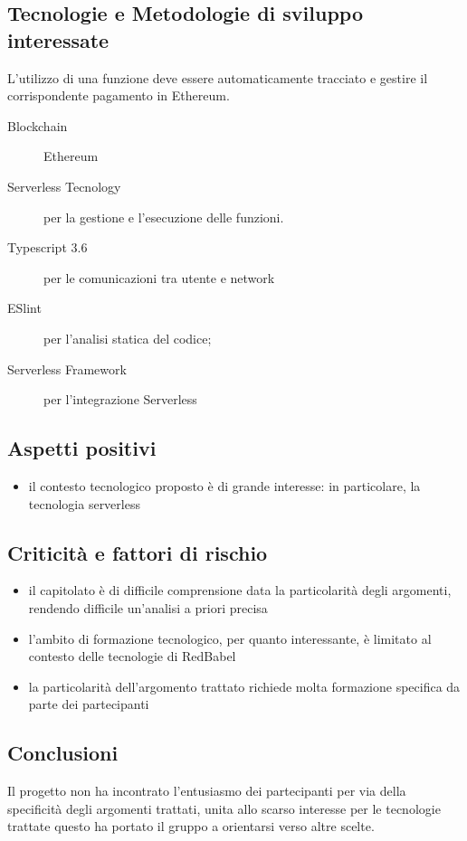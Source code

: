 \documentclass[../studio-di-fattibilita.tex]{subfiles}
\begin{document}
	\subsection{Tecnologie e Metodologie di sviluppo interessate}
	\label{subsec:tecnologie_interessate}
    L'utilizzo di una funzione deve essere automaticamente tracciato e gestire il corrispondente pagamento in Ethereum.	
	\begin{description}
		\item[Blockchain] Ethereum
		\item[Serverless Tecnology] per la gestione e l'esecuzione delle funzioni.
		\item[Typescript 3.6] per le comunicazioni tra utente e network
		\item[ESlint] per l'analisi statica del codice;
		\item[Serverless Framework] per l'integrazione Serverless
	\end{description}
	\subsection{Aspetti positivi}
	\label{subsec:aspetti_positivi}
	\begin{itemize}
		\item il contesto tecnologico proposto è di grande interesse: in particolare, la tecnologia serverless
	\end{itemize}
	\subsection{Criticità e fattori di rischio}
	\label{subsec:criticità_e_fattori_di_rischio}
	\begin{itemize}
		\item il capitolato è di difficile comprensione data la particolarità degli argomenti, rendendo difficile un'analisi a priori precisa 
		\item l'ambito di formazione tecnologico, per quanto interessante, è limitato al contesto delle tecnologie di RedBabel
		\item la particolarità dell'argomento trattato richiede molta formazione specifica da parte dei partecipanti
	\end{itemize}
	\subsection{Conclusioni}
	\label{subsec:conclusioni}
	Il progetto non ha incontrato l'entusiasmo dei partecipanti per via della specificità degli argomenti trattati, unita allo scarso interesse per le tecnologie trattate 
questo ha portato il gruppo a orientarsi verso altre scelte.
\end{document}
